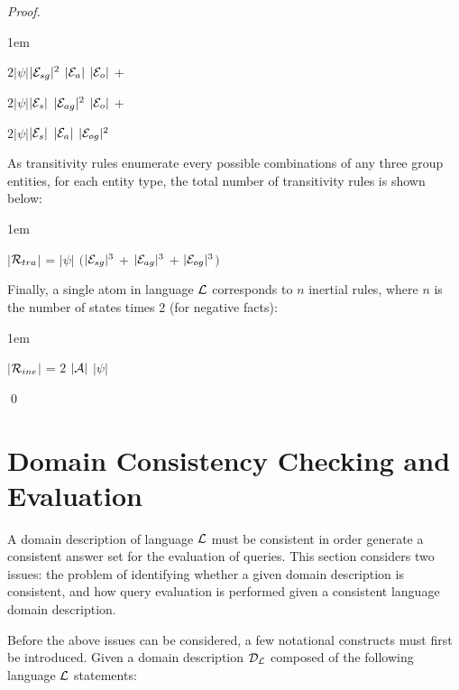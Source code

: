 \documentclass[global,twocolumn,final]{svjour}
\newenvironment{vproof}
  {\begin{proof}\hspace{0.25em}}
  {\qed\end{proof}}
\newenvironment{vquote}
  {\begin{list}{}{\leftmargin 1em}\item[]}
  {\end{list}}
\begin{document}
\begin{vproof}
\begin{vquote}
            \hspace{1em}
            $2|\psi|$$|{\cal E}_{sg}|^{2}$ $|{\cal E}_{a}|$ $|{\cal E}_{o}|$ +

            \hspace{1em}
            $2|\psi|$$|{\cal E}_{s}|$ $|{\cal E}_{ag}|^{2}$ $|{\cal E}_{o}|$ +

            \hspace{1em}
            $2|\psi|$$|{\cal E}_{s}|$ $|{\cal E}_{a}|$ $|{\cal E}_{og}|^{2}$
          \end{vquote}

          As transitivity rules enumerate every possible combinations of any
          three group entities, for each entity type, the total number of
          transitivity rules is shown below:

          \begin{vquote}
            $|$${\cal R}_{tra}$$|$ =
            $|\psi|$ $($$|{\cal E}_{sg}|^{3}$ +
            $|{\cal E}_{ag}|^{3}$ +
            $|{\cal E}_{og}|^{3}$$)$
          \end{vquote}

          Finally, a single atom in language ${\cal L}$ corresponds to $n$
          inertial rules, where $n$ is the number of states times 2 (for
          negative facts):

          \begin{vquote}
            $|$${\cal R}_{ine}$$|$ =
            $2$ $|{\cal A}|$ $|\psi|$
          \end{vquote}
        \end{vproof}

  \section{Domain Consistency Checking and Evaluation}
    \label{sec-cons}

    A domain description of language ${\cal L}$ must be consistent in order
    generate a consistent answer set for the evaluation of queries. This
    section considers two issues: the problem of identifying whether a given
    domain description is consistent, and how query evaluation is performed
    given a consistent language domain description.

    Before the above issues can be considered, a few notational constructs
    must first be introduced. Given a domain description ${\cal D_{L}}$
    composed of the following language ${\cal L}$ statements:
\end{document}
